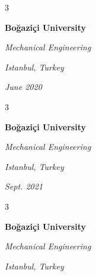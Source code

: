 \documentclass[10pt, letterpaper]{article}
\newenvironment{threecolentry}[3][]{
    \onecolentry
    \def\thirdColumn{#3}
    \setcolumnwidth{0.6 cm, \fill, 4.5 cm}
    \begin{paracol}{3}
    #2 \switchcolumn
}{
    \switchcolumn \raggedleft \thirdColumn
    \end{paracol}
    \endonecolentry
} %
\begin{document}
        \begin{threecolentry}{
            \vspace*{\fill}
            \textbullet
            \vspace*{3px}
            \vspace*{\fill}
        }{
        \textit{Istanbul, Turkey}    
            
        \textit{June 2020}}
            \textbf{Boğaziçi University}

            \textit{Mechanical Engineering}
        \end{threecolentry}



        \vspace{0.2 cm-3px}

        \begin{threecolentry}{
            \vspace*{\fill}
            \textbullet
            \vspace*{3px}
            \vspace*{\fill}
        }{
        \textit{Istanbul, Turkey}    
            
        \textit{Sept. 2021}}
            \textbf{Boğaziçi University}

            \textit{Mechanical Engineering}
        \end{threecolentry}



        \vspace{0.2 cm-3px}

        \begin{threecolentry}{
            \vspace*{\fill}
            \textbullet
            \vspace*{3px}
            \vspace*{\fill}
        }{
        \textit{Istanbul, Turkey}    
            
        }
            \textbf{Boğaziçi University}

            \textit{Mechanical Engineering}
        \end{threecolentry}
\end{document}
